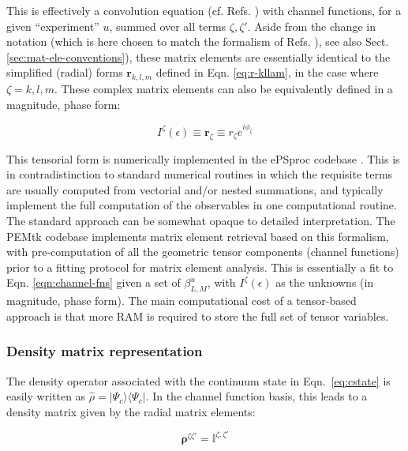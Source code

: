 \documentclass[10pt]{article}
\begin{document}
This is effectively a convolution equation (cf. Refs. \cite{Reid2000,gregory2021MolecularFramePhotoelectron}) with channel functions, for a given ``experiment'' $u$, summed over all terms $\zeta,\zeta'$. Aside from the change in notation (which is here chosen to match the formalism of Refs. \cite{Gianturco1994, Lucchese1986, Natalense1999}), see also Sect. \ref{sec:mat-ele-conventions}), these matrix elements are essentially identical to the simplified (radial) forms $\mathbf{r}_{k,l,m}$ defined in Eqn. \ref{eq:r-kllam}, in the case where $\zeta=k,l,m$. These complex matrix elements can also be equivalently defined in a magnitude, phase form:

\begin{equation}
I^{\zeta}(\epsilon)\equiv\mathbf{r}_{\zeta}\equiv r_{\zeta}e^{i\phi_{\zeta}}
\end{equation}


This tensorial form is numerically implemented in the ePSproc codebase \cite{ePSprocGithub}. This is in contradistinction to standard numerical routines in which the requisite terms are usually computed from vectorial and/or nested summations, and typically implement the full computation of the observables in one computational routine. The standard approach can be somewhat opaque to detailed interpretation.  The PEMtk codebase \cite{hockett2021PEMtkGithub} implements matrix element retrieval based on this formalism, with pre-computation of all the geometric tensor components (channel functions) prior to a fitting protocol for matrix element analysis. This is essentially a fit to Eqn. \ref{eqn:channel-fns} given a set of $\beta_{L,M}^{u}$, with $I^{\zeta}(\epsilon)$ as the unknowns (in magnitude, phase form). The main computational cost of a tensor-based approach is that more RAM is required to store the full set of tensor variables.

\subsubsection{Density matrix representation\label{sec:density-mat-basic}}
The density operator associated with the continuum state in Eqn.~\ref{eq:cstate} is easily written as $\hat{\rho}=|\Psi_c\rangle\langle\Psi_c|$. In the channel function basis, this leads to a density matrix given by the radial matrix elements:

\begin{equation}
\mathbf{\rho}^{\zeta\zeta'} = \mathbb{I}^{\zeta,\zeta'}
\label{eqn:radial-density-mat}
\end{equation}
\end{document}

